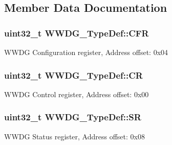 \subsection{Member Data Documentation}
\hypertarget{struct_w_w_d_g___type_def_adcd6a7e5d75022e46ce60291f4b8544c}{
\subsubsection[{C\-F\-R}]{ uint32\-\_\-t W\-W\-D\-G\-\_\-\-Type\-Def\-::\-C\-F\-R}}\label{struct_w_w_d_g___type_def_adcd6a7e5d75022e46ce60291f4b8544c}
W\-W\-D\-G Configuration register, Address offset\-: 0x04 \hypertarget{struct_w_w_d_g___type_def_a4caf530d45f7428c9700d9c0057135f8}{
\subsubsection[{C\-R}]{ uint32\-\_\-t W\-W\-D\-G\-\_\-\-Type\-Def\-::\-C\-R}}\label{struct_w_w_d_g___type_def_a4caf530d45f7428c9700d9c0057135f8}
W\-W\-D\-G Control register, Address offset\-: 0x00 \hypertarget{struct_w_w_d_g___type_def_a15655cda4854cc794db1f27b3c0bba38}{
\subsubsection[{S\-R}]{ uint32\-\_\-t W\-W\-D\-G\-\_\-\-Type\-Def\-::\-S\-R}}\label{struct_w_w_d_g___type_def_a15655cda4854cc794db1f27b3c0bba38}
W\-W\-D\-G Status register, Address offset\-: 0x08 

